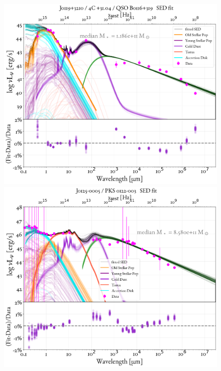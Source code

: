 \begin{figure}
    \centering
    \includegraphics[width=0.85\linewidth]{figures/ResultFits/8_SEDfit_182.png}\\
    \includegraphics[width=0.85\linewidth]{figures/ResultFits/9_SEDfit_201.png}    
\end{figure}
